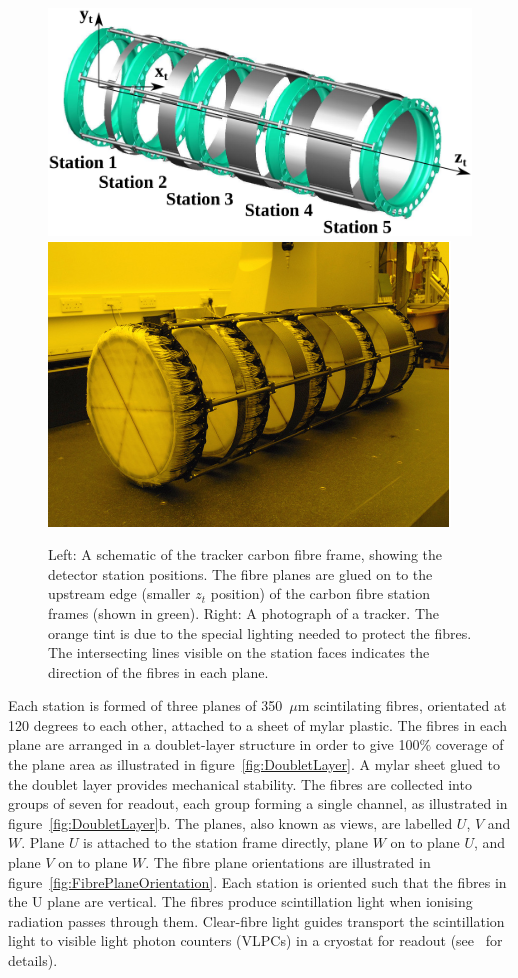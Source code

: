   \begin{figure}[tbh]
    \centering
    \includegraphics[width=0.5\linewidth]{01-MICE/TrackerFrame.pdf} \hspace{2pc}%
    \includegraphics[width=0.35\linewidth]{01-MICE/TrackerPhoto.pdf}
    \caption{\label{fig:Trackers} Left: A schematic of the tracker carbon fibre frame, showing the detector station positions.  The fibre planes are glued on to the upstream edge (smaller $z_t$ position) of the carbon fibre station frames (shown in green). Right: A photograph of a tracker. The orange tint is due to the special lighting needed to protect the fibres. The intersecting lines visible on the station faces indicates the direction of the fibres in each plane.}
  \end{figure}

  Each station is formed of three planes of 350~$\mu$m scintilating fibres, orientated at 120 degrees to each other, attached to a sheet of mylar plastic. The fibres in each plane are arranged in a doublet-layer structure in order to give 100$\%$ coverage of the plane area as illustrated in figure~\ref{fig:DoubletLayer}. A mylar sheet glued to the doublet layer provides mechanical stability. The fibres are collected into groups of seven for readout, each group forming a single channel, as illustrated in figure~\ref{fig:DoubletLayer}b. The planes, also known as views, are labelled $U$, $V$ and $W$. Plane $U$ is attached to the station frame directly, plane $W$ on to plane $U$, and plane $V$ on to plane $W$. The fibre plane orientations are illustrated in figure~\ref{fig:FibrePlaneOrientation}. Each station is oriented such that the fibres in the U plane are vertical. The fibres produce scintillation light when ionising radiation passes through them. Clear-fibre light guides transport the scintillation light to visible light photon counters (VLPCs) in a cryostat for readout (see~\cite{MiceTrackers} for details).

